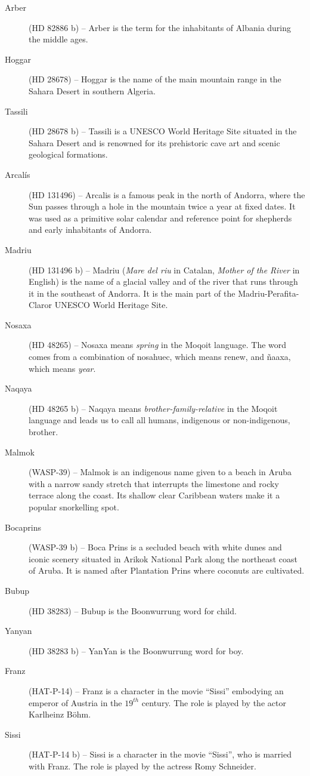 \begin{description}
\item[Arber] (HD 82886 b) -- Arber is the term for the inhabitants of Albania during the middle ages.
\item[Hoggar] (HD 28678) -- Hoggar is the name of the main mountain range in the Sahara Desert in southern Algeria.
\item[Tassili] (HD 28678 b) -- Tassili is a UNESCO World Heritage Site situated in the Sahara Desert and is renowned for its prehistoric cave art and scenic geological formations.
\item[Arcalís] (HD 131496) -- Arcalis is a famous peak in the north of Andorra, where the Sun passes through a hole in the mountain twice a year at fixed dates. It was used as a primitive solar calendar and reference point for shepherds and early inhabitants of Andorra.
\item[Madriu] (HD 131496 b) -- Madriu (\textit{Mare del riu} in Catalan, \textit{Mother of the River} in English) is the name of a glacial valley and of the river that runs through it in the southeast of Andorra. It is the main part of the Madriu-Perafita-Claror UNESCO World Heritage Site.
\item[Nosaxa] (HD 48265) -- Nosaxa means \textit{spring} in the Moqoit language. The word comes from a combination of nosahuec, which means renew, and ñaaxa, which means \textit{year}.
\item[Naqaya] (HD 48265 b) -- Naqaya means \textit{brother-family-relative} in the Moqoit language and leads us to call all humans, indigenous or non-indigenous, brother.
\item[Malmok] (WASP-39) -- Malmok is an indigenous name given to a beach in Aruba with a narrow sandy stretch that interrupts the limestone and rocky terrace along the coast. Its shallow clear Caribbean waters make it a popular snorkelling spot.
\item[Bocaprins] (WASP-39 b) -- Boca Prins is a secluded beach with white dunes and iconic scenery situated in Arikok National Park along the northeast coast of Aruba. It is named after Plantation Prins where coconuts are cultivated.
\item[Bubup] (HD 38283) -- Bubup is the Boonwurrung word for child.
\item[Yanyan] (HD 38283 b) -- YanYan is the Boonwurrung word for boy.
\item[Franz] (HAT-P-14) -- Franz is a character in the movie ``Sissi'' embodying an emperor of Austria in the $19^{th}$ century. The role is played by the actor Karlheinz Böhm.
\item[Sissi] (HAT-P-14 b) -- Sissi is a character in the movie ``Sissi'', who is married with Franz. The role is played by the actress Romy Schneider.

\end{description}
